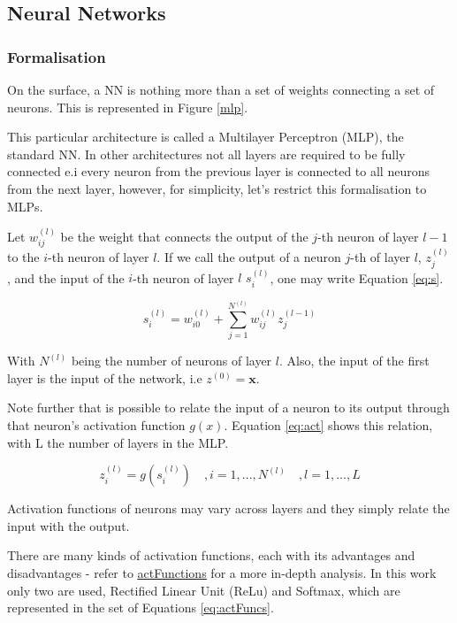 \subsection{Neural Networks}

\subsubsection{Formalisation}



On the surface, a NN is nothing more than a set of weights connecting a set of neurons. This is represented in Figure \ref{mlp}.


This particular architecture is called a Multilayer Perceptron (MLP), the standard NN. In other architectures not all layers are required to be fully connected e.i every neuron from the previous layer is connected to all neurons from the next layer, however, for simplicity, let's restrict this formalisation to MLPs.

Let $w_{ij}^{(l)}$ be the weight that connects the output of the $j$-th neuron of layer $l-1$ to the $i$-th neuron of layer $l$. If we call the output of a neuron $j$-th of layer $l$, $z_j^{(l)}$, and the input of the $i$-th neuron of layer $l$ $s_i^{(l)}$, one may write Equation \eqref{eq:s}.

\begin{equation} \label{eq:s}
    s_{i}^{(l)} = w_{i 0}^{(l)} + \sum_{j=1}^{N^{(l)}} w_{ij}^{(l)} z_j^{(l-1)}
\end{equation}

With $N^{(l)}$ being the number of neurons of layer $l$. Also, the input of the first layer is the input of the network, i.e $z^{(0)} = \mathbf{x}$. 

Note further that is possible to relate the input of a neuron to its output through that neuron's activation function $g(x)$. Equation \eqref{eq:act} shows this relation, with L the number of layers in the MLP. 

\begin{equation}\label{eq:act}
    z_{i}^{(l)} = g\left(s_{i}^{(l)}\right) \quad , i = 1, ..., N^{(l)} \quad, l = 1, ... , L
\end{equation}

Activation functions of neurons may vary across layers and they simply relate the input with the output. 

There are many kinds of activation functions, each with its advantages and disadvantages - refer to \href{towardsdatascience.com/comparison-of-activation-functions-for-deep-neural-networks-706ac4284c8a}{\ul{actFunctions}} for a more in-depth analysis. In this work only two are used, Rectified Linear Unit (ReLu) and Softmax, which are represented in the set of Equations \eqref{eq:actFuncs}.

